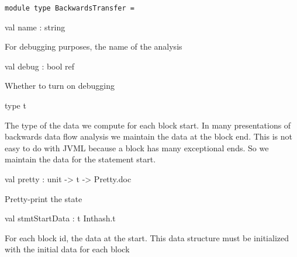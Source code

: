 \documentclass[11pt]{article}
\begin{document}
\begin{ocamldoccode}
{\tt{module type }}{\tt{BackwardsTransfer}}{\tt{ = }}\end{ocamldoccode}
\label{moduletype:Dataflow.BackwardsTransfer}

\begin{ocamldocsigend}


\label{val:Dataflow.BackwardsTransfer.name}\begin{ocamldoccode}
val name : string
\end{ocamldoccode}
\begin{ocamldocdescription}
For debugging purposes, the name of the analysis


\end{ocamldocdescription}


\label{val:Dataflow.BackwardsTransfer.debug}\begin{ocamldoccode}
val debug : bool ref
\end{ocamldoccode}
\begin{ocamldocdescription}
Whether to turn on debugging


\end{ocamldocdescription}


\label{type:Dataflow.BackwardsTransfer.t}\begin{ocamldoccode}
type t 
\end{ocamldoccode}
\begin{ocamldocdescription}
The type of the data we compute for each block start. In many 
 presentations of backwards data flow analysis we maintain the 
 data at the block end. This is not easy to do with JVML because 
 a block has many exceptional ends. So we maintain the data for 
 the statement start.


\end{ocamldocdescription}


\label{val:Dataflow.BackwardsTransfer.pretty}\begin{ocamldoccode}
val pretty : unit -> t -> Pretty.doc
\end{ocamldoccode}
\begin{ocamldocdescription}
Pretty-print the state


\end{ocamldocdescription}


\label{val:Dataflow.BackwardsTransfer.stmtStartData}\begin{ocamldoccode}
val stmtStartData : t Inthash.t
\end{ocamldoccode}
\begin{ocamldocdescription}
For each block id, the data at the start. This data structure must be 
 initialized with the initial data for each block



\end{ocamldocdescription}
\end{ocamldocsigend}
\end{document}
